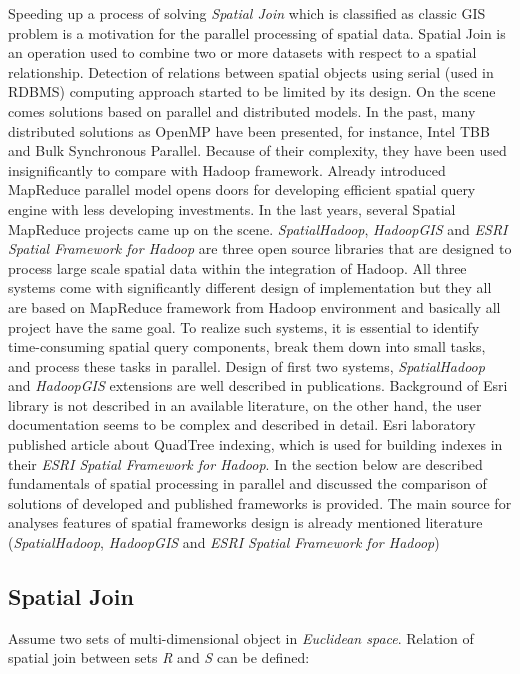 \documentclass[a4paper,12pt,oneside]{report}
\begin{document}
	Speeding up a process of solving \textit{Spatial Join} which is classified as
	classic GIS 
	problem is a motivation for the parallel processing of spatial data. Spatial
	Join 
	is an operation used to combine two or more datasets with respect to a spatial 
	relationship. Detection of relations between spatial objects using serial (used
	in RDBMS) 
	computing approach started to be limited by its design. On the scene comes
	solutions
	based on parallel and distributed models. In the past, many distributed 
	solutions as OpenMP\cite{omp} have been presented, for instance, Intel TBB and
	Bulk Synchronous Parallel\cite{multi_cpu}.
	Because of their complexity, they have been used insignificantly to compare with
	Hadoop framework.
	Already introduced MapReduce parallel model opens doors for developing efficient
	spatial query engine with less developing investments. In the last years,
	several Spatial MapReduce projects came up on the scene.
	\textit{SpatialHadoop}\cite{spatialhadoop}, \textit{HadoopGIS}\cite{hadoopGIS}
	and \textit{ESRI Spatial Framework for Hadoop}\cite{esri_framework}
	are three open source libraries that are designed to process large scale spatial
	data within the integration of Hadoop.
	All three systems come with significantly different design of implementation but
	they all are based
	on MapReduce framework from Hadoop environment and basically all project have
	the same goal.
	To realize such systems, it is essential to identify time-consuming spatial
	query components,
	break them down into small tasks, and process these tasks in parallel. 
	Design of first two systems, \textit{SpatialHadoop} and \textit{HadoopGIS}
	extensions are well described in publications. Back\-ground of Esri library is not
	described in an available
	literature, on the other hand, the user documentation seems to be complex and
	described in detail. 
	Esri laboratory published article\cite{esri_indexing} about QuadTree indexing,
	which is used for building 
	indexes in their \textit{ESRI Spatial Framework for Hadoop}.
	In the section below are described fundamentals of spatial processing in
	parallel and  discussed 
	the comparison of solutions of developed and published frameworks is provided.
	The main source for  analyses features of spatial frameworks design is already
	mentioned literature (\textit{SpatialHadoop}\cite{spatialhadoop},
	\textit{HadoopGIS}\cite{hadoopGIS} 
	and \textit{ESRI Spatial Framework for Hadoop}\cite{esri_framework})
	
	
	\subsection{Spatial Join}
	\label{sub:spatial_join}
	Assume two sets of multi-dimensional object in \emph{Euclidean space}. Relation
	of spatial 
	join between sets \emph{R} and \emph{S} can be defined\cite{spatial_join2}:
	
\end{document}
